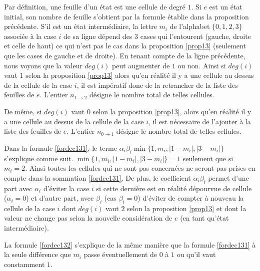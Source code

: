  \begin{Pre}
 Par définition, une feuille d'un état est une cellule de degré $1$. Si $e$ est un état initial,  son nombre de feuille s'obtient par la formule établie dans la proposition précédente. S'il est un état intermédiaire, la lettre $m_{i}$ de l'alphabet $\{0,1,2,3\}$  associée à la case $i$ de sa ligne dépend des $3$ cases qui l'entourent (gauche, droite et celle de haut) ce qui n'est pas le cas dans la proposition \ref{prop13} (seulement que les cases de gauche et de droite). En tenant compte de la ligne précédente, nous voyons que la valeur $deg(i)$ peut augmenter de $1$ ou non. Ainsi si $deg(i)$ vaut $1$ selon la proposition \ref{prop13} alors qu'en réalité il y a une cellule au dessus de la cellule de la case $i$, il est impératif donc de la retrancher de la liste des feuilles de $e$. L'entier $n_{1\rightarrow 2}$ désigne le nombre total de telles cellules.
 
  De même, si $deg(i)$ vaut $0$ selon la proposition \ref{prop13}, alors qu'en réalité il y a une cellule au dessus de la cellule de la case $i$, il est nécessaire  de l'ajouter à la liste des feuilles de $e$. L'entier $n_{0\rightarrow 1}$ désigne le nombre total de telles cellules.
  
 Dans la formule \ref{fordec131}, le terme $\alpha_{i}\beta_{i}\min\{1,m_{i},\vert 1-m_{i}\vert, \vert 3-m_{i}\vert\}$ s'explique comme suit. $\min\{1,m_{i},\vert 1-m_{i}\vert, \vert 3-m_{i}\vert\}=1$ seulement que si $m_{i}=2$. Ainsi toutes les cellules qui ne sont pas concernées ne seront pas prises en compte dans la sommation \ref{fordec131}. De plus, le coefficient $\alpha_{i}\beta_{i}$ permet d'une part avec $\alpha_{i}$ d'éviter la case $i$ si cette dernière est en réalité dépourvue de cellule ($\alpha_{i}=0$) et d'autre part, avec $\beta_{i}$ (cas $\beta_{i}=0$) d'éviter de compter à nouveau la cellule de la case $i$ dont  $deg(i)$ vaut $2$  selon la proposition \ref{prop13} et dont la valeur ne change pas selon la nouvelle considération de $e$ (en tant qu'état intermédiaire).
  
La formule \ref{fordec132}  s'explique de la même manière que la formule \ref{fordec131} à la seule différence que $m_{i}$ passe éventuellement de $0$ à $1$ ou qu'il vaut  constamment $1$.
\end{Pre}
